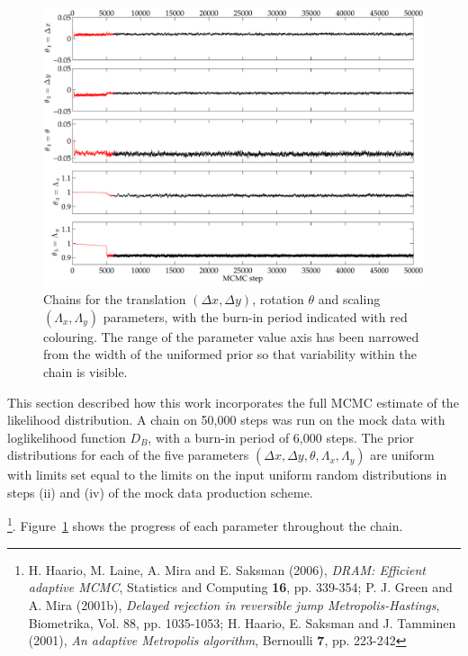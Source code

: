 \documentclass[manuscript]{aastex}
\begin{document}
\begin{figure}[h]
\centering
\includegraphics[width=\linewidth]{figures/chain_test.pdf}
\caption{Chains for the translation $(\Delta x, \Delta y)$, rotation $\theta$ and scaling $(\Lambda_x,\Lambda_y)$ parameters, with the burn-in period indicated with red colouring. The range of the parameter value axis has been narrowed from the width of the uniformed prior so that variability within the chain is visible.}\label{fig:chains}
\end{figure}
This section described how this work incorporates the full MCMC estimate of the likelihood distribution. A chain on 50,000 steps was run on the mock data with loglikelihood function $D_B$, with a burn-in period of 6,000 steps. The prior distributions for each of the five parameters $(\Delta x, \Delta y, \theta, \Lambda_x, \Lambda_y)$ are uniform with limits set equal to the limits on the input uniform random distributions in steps (ii) and (iv) of the mock data production scheme. 

\footnote{H. Haario, M. Laine, A. Mira and E. Saksman (2006), \emph{DRAM: Efficient adaptive MCMC}, Statistics and Computing \textbf{16}, pp. 339-354; P. J. Green and A. Mira (2001b), \emph{Delayed rejection in reversible jump Metropolis-Hastings}, Biometrika, Vol. 88, pp. 1035-1053; H. Haario, E. Saksman and J. Tamminen (2001), \emph{An adaptive Metropolis algorithm}, Bernoulli \textbf{7}, pp. 223-242}. Figure~\ref{fig:chains} shows the progress of each parameter throughout the chain.
\end{document}
